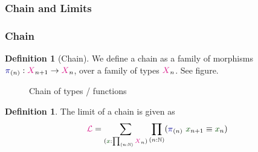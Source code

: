 \documentclass[xelatex,mathserif,serif,notheorems]{beamer} %
\theoremstyle{plain} %
\theoremstyle{definition}
\newtheorem{defn}[thm]{Definition}%
\theoremstyle{remark}
\newcommand*{\term}[1]{\textcolor{green!30!black}{#1}} %
\newcommand*{\type}[1]{\textcolor{magenta!90!black}{#1}}
\newcommand*{\function}[1]{\textcolor{blue!60!black}{\ensuremath{\mathtt{#1}}}}
\newcommand{\setlengths}{
  \setlength{\abovedisplayskip}{4pt}
  \setlength{\belowdisplayskip}{4pt}
  \setlength{\abovedisplayshortskip}{2pt}
  \setlength{\belowdisplayshortskip}{2pt}
}
\begin{document}
\subsubsection{Chain and Limits}
\begin{frame}[fragile]
  \frametitle{Chain}
  \begin{defn}[Chain]\setlengths
    We define a chain as a family of morphisms \(\function{\pi}_{(n)} : \type{X}_{n+1} \rightarrow \type{X}_{n}\), over a family of types \(\type{X}_{n}\). See figure.
  \end{defn}
  \begin{figure}[h]
    \centering
    \caption{Chain of types / functions}
    \label{fig:x-chain}
  \end{figure}
  \begin{defn}\setlengths
    The limit of a chain is given as
    \begin{equation}
      \type{\mathcal{L}} = \sum_{(\term{x} : \prod_{(n : \mathbb{N})} \type{X}_n)} \prod_{(n : \mathbb{N})} (\function{\pi}_{(n)}~\term{x}_{n+1} \equiv \term{x}_n)
    \end{equation}
  \end{defn}
\end{frame}
\end{document}
